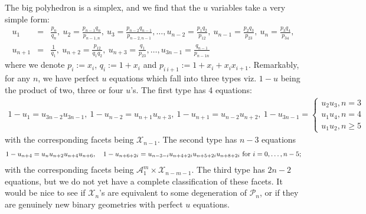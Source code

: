 \documentclass[hidelinks,12pt]{article}
\newcommand{\bea}[1]{\begin{eqnarray}\label{#1} }
\newcommand{\eea}{\end{eqnarray}}
\def\bea{\begin{eqnarray}}
\def\eea{\end{eqnarray}}
\begin{document}
The big polyhedron is a simplex, and we find that the $u$ variables take a very simple form:
\bea
u_1 &=& \frac{p_n}{q_n}, ~u_2 = \frac{p_{n-1}q_n}{p_{n-1,n}},~u_3 = \frac{p_{n-2}q_{n-1}}{p_{n-2,n-1}}, \dots,
u_{n-2} = \frac{p_1 q_2}{p_{12}}, ~u_{n-1} = \frac{p_{2}q_3}{p_{23}},~u_n = \frac{p_{3}q_{4}}{p_{34}}, \nonumber \\
u_{n+1} &=& \frac{1}{q_1}, ~u_{n+2} = \frac{p_{12}}{q_{1}q_{2}},~u_{n+3} = \frac{q_{1}}{p_{23}}, \dots,
u_{3n-1} = \frac{ q_{n-1}}{p_{n-1n}} 
\eea
where we denote $p_i :=x_i$, $q_i := 1+x_i$ and $p_{i~i+1}:=1+x_i+ x_i x_{i+1}$. Remarkably, for any $n$, we have perfect $u$ equations which fall into three types viz. $1-u$ being the product of two, three or four $u$'s. The first type has 4 equations:
\bea
1-u_{1} =u_{3n-2} u_{3n-1},~
1-u_{n-2} =u_{n+1} u_{n+3},~
1-u_{n+1} =u_{n-2} u_{n+2},~
1-u_{3n-1} = \begin{cases}
u_{2} u_{3} , n=3\\
u_{1} u_{4} , n=4\\
u_{1} u_{2} , n\geq 5
\end{cases} 
\eea
with the corresponding facets being $\mathscr{X}_{n-1}$. The second type has $n-3$ equations
\bea
1-u_{n+4} =u_{n} u_{n+2}u_{n+4} u_{n+6}, \quad 1-u_{n+6+2 i} =u_{n-3-i} u_{n+4+2 i} u_{n+5+2 i} u_{n+8+2 i}~ {\rm for}~i=0,\dots,n-5;
\eea
with the corresponding facets being $\mathscr{A}^{m}_1 \times \mathscr{X}_{n-m-1}$. The third type has $2n-2$ equations, but we do not yet have a complete classification of these facets. It would be nice to see if $\mathscr{X}_n$'s are equivalent to some degeneration of $\mathscr{P}_n$, or if they are genuinely new binary geometries with perfect $u$ equations.  
%
%
%
%
\end{document}
